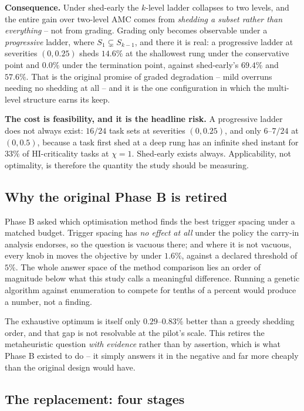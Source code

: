 \textbf{Consequence.} Under shed-early the $k$-level ladder collapses to two
levels, and the entire gain over two-level AMC comes from \emph{shedding a
subset rather than everything} -- not from grading. Grading only becomes
observable under a \emph{progressive} ladder, where $S_1 \subsetneq S_{k-1}$,
and there it is real: a progressive ladder at severities $(0, 0.25)$ sheds
$14.6\%$ at the shallowest rung under the conservative point and $0.0\%$ under
the termination point, against shed-early's $69.4\%$ and $57.6\%$. That is the
original promise of graded degradation -- mild overruns needing no shedding at
all -- and it is the one configuration in which the multi-level structure earns
its keep.

\textbf{The cost is feasibility, and it is the headline risk.} A progressive
ladder does not always exist: $16/24$ task sets at severities $(0, 0.25)$, and
only $6$--$7/24$ at $(0, 0.5)$, because a task first shed at a deep rung has an
infinite shed instant for $33\%$ of HI-criticality tasks at $\chi = 1$. Shed-early
exists always. Applicability, not optimality, is therefore the quantity the
study should be measuring.

\subsection{Why the original Phase B is retired}

Phase B asked which optimisation method finds the best trigger spacing under a
matched budget. Trigger spacing has \emph{no effect at all} under the policy the
carry-in analysis endorses, so the question is vacuous there; and where it is
not vacuous, every knob in  moves the objective by under
$1.6\%$, against a declared threshold of $5\%$. The whole answer space of the
method comparison lies an order of magnitude below what this study calls a
meaningful difference. Running a genetic algorithm against enumeration to
compete for tenths of a percent would produce a number, not a finding.

The exhaustive optimum is itself only $0.29$--$0.83\%$ better than a greedy
shedding order, and that gap is not resolvable at the pilot's scale. This
retires the metaheuristic question \emph{with evidence} rather than by
assertion, which is what Phase B existed to do -- it simply answers it in the
negative and far more cheaply than the original design would have.

\subsection{The replacement: four stages}

